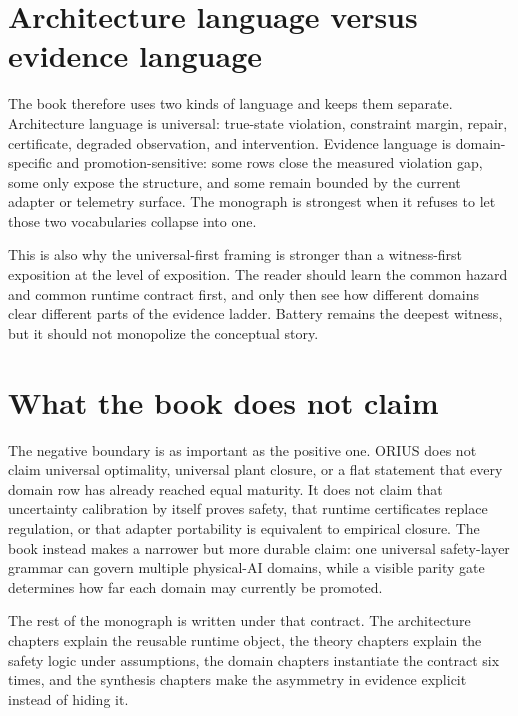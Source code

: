 \section{Architecture language versus evidence language}
The book therefore uses two kinds of language and keeps them separate.  Architecture
language is universal: true-state violation, constraint margin, repair, certificate,
degraded observation, and intervention.  Evidence language is domain-specific and
promotion-sensitive: some rows close the measured violation gap, some only expose the
structure, and some remain bounded by the current adapter or telemetry surface.  The
monograph is strongest when it refuses to let those two vocabularies collapse into one.

This is also why the universal-first framing is stronger than a witness-first exposition at
the level of exposition.  The reader should learn the common hazard and common runtime
contract first, and only then see how different domains clear different parts of the
evidence ladder.  Battery remains the deepest witness, but it should not monopolize the
conceptual story.

\section{What the book does not claim}
The negative boundary is as important as the positive one.  ORIUS does not claim
universal optimality, universal plant closure, or a flat statement that every domain row
has already reached equal maturity.  It does not claim that uncertainty calibration by
itself proves safety, that runtime certificates replace regulation, or that adapter
portability is equivalent to empirical closure.  The book instead makes a narrower but
more durable claim: one universal safety-layer grammar can govern multiple physical-AI
domains, while a visible parity gate determines how far each domain may currently be
promoted.

The rest of the monograph is written under that contract.  The architecture chapters
explain the reusable runtime object, the theory chapters explain the safety logic under
assumptions, the domain chapters instantiate the contract six times, and the synthesis
chapters make the asymmetry in evidence explicit instead of hiding it.
